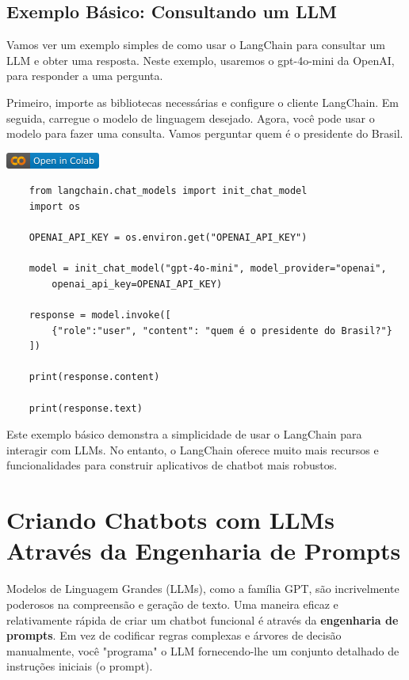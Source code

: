 \documentclass[14pt,a4paper,oneside]{book}
\begin{document}
\section{Exemplo Básico: Consultando um LLM}

Vamos ver um exemplo simples de como usar o LangChain para consultar um LLM e obter uma resposta. Neste exemplo, usaremos o gpt-4o-mini da OpenAI, para responder a uma pergunta.

Primeiro, importe as bibliotecas necessárias e configure o cliente LangChain. Em seguida, carregue o modelo de linguagem desejado. Agora, você pode usar o modelo para fazer uma consulta. Vamos perguntar quem é o presidente do Brasil.

\vspace{\baselineskip}
\href{https://colab.research.google.com/github/giseldo/chatbotbook_v2/blob/main/notebook/langchain.ipynb}{
  \includegraphics{fig/colab-badge.png}
}

\begin{verbatim}
	from langchain.chat_models import init_chat_model
	import os

	OPENAI_API_KEY = os.environ.get("OPENAI_API_KEY")

	model = init_chat_model("gpt-4o-mini", model_provider="openai", 
		openai_api_key=OPENAI_API_KEY)

	response = model.invoke([
		{"role":"user", "content": "quem é o presidente do Brasil?"}
	])

	print(response.content)

	print(response.text)
\end{verbatim}

Este exemplo básico demonstra a simplicidade de usar o LangChain para interagir com LLMs. No entanto, o LangChain oferece muito mais recursos e funcionalidades para construir aplicativos de chatbot mais robustos.

\chapter{Criando Chatbots com LLMs Através da Engenharia de Prompts}

Modelos de Linguagem Grandes (LLMs), como a família GPT, são incrivelmente poderosos na compreensão e geração de texto. Uma maneira eficaz e relativamente rápida de criar um chatbot funcional é através da \textbf{engenharia de prompts}. Em vez de codificar regras complexas e árvores de decisão manualmente, você "programa" o LLM fornecendo-lhe um conjunto detalhado de instruções iniciais (o prompt).
\end{document}
